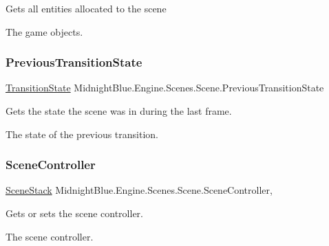 Gets all entities allocated to the scene 

The game objects.\hypertarget{class_midnight_blue_1_1_engine_1_1_scenes_1_1_scene_a13fa8b0788c8b7499a79b9f6374465c8}{}\label{class_midnight_blue_1_1_engine_1_1_scenes_1_1_scene_a13fa8b0788c8b7499a79b9f6374465c8} 
\subsubsection{\texorpdfstring{Previous\+Transition\+State}{PreviousTransitionState}}
{\footnotesize\ttfamily \hyperlink{namespace_midnight_blue_1_1_engine_1_1_scenes_a829c47ebe553886b3b3e92db386e2557}{Transition\+State} Midnight\+Blue.\+Engine.\+Scenes.\+Scene.\+Previous\+Transition\+State\hspace{0.3cm}{\ttfamily [get]}}



Gets the state the scene was in during the last frame. 

The state of the previous transition.\hypertarget{class_midnight_blue_1_1_engine_1_1_scenes_1_1_scene_a1a8c2aa7f4d60a3a99043f31392ddecb}{}\label{class_midnight_blue_1_1_engine_1_1_scenes_1_1_scene_a1a8c2aa7f4d60a3a99043f31392ddecb} 
\subsubsection{\texorpdfstring{Scene\+Controller}{SceneController}}
{\footnotesize\ttfamily \hyperlink{class_midnight_blue_1_1_engine_1_1_scenes_1_1_scene_stack}{Scene\+Stack} Midnight\+Blue.\+Engine.\+Scenes.\+Scene.\+Scene\+Controller\hspace{0.3cm}{\ttfamily [get]}, {\ttfamily [set]}}



Gets or sets the scene controller. 

The scene controller.\hypertarget{class_midnight_blue_1_1_engine_1_1_scenes_1_1_scene_a6c674383c2a71025e9ab2f6c5e0d1139}{}\label{class_midnight_blue_1_1_engine_1_1_scenes_1_1_scene_a6c674383c2a71025e9ab2f6c5e0d1139} 
